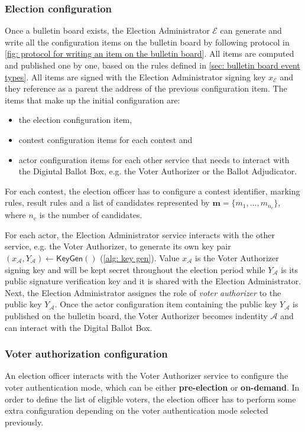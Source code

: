 \subsubsection{Election configuration} \label{sec: election configuration}
Once a bulletin board exists, the Election Administrator $\mathcal{E}$ can generate and write all the configuration items on the bulletin board by following protocol in \cref{fig: protocol for writing an item on the bulletin board}. All items are computed and published one by one, based on the rules defined in \cref{sec: bulletin board event types}. All items are signed with the Election Administrator signing key $x_\mathcal{E}$ and they reference as a parent the address of the previous configuration item. The items that make up the initial configuration are:
\begin{itemize}
    \item the election configuration item,
    \item contest configuration items for each contest and
    \item actor configuration items for each other service that needs to interact with the Digiutal Ballot Box, e.g. the Voter Authorizer or the Ballot Adjudicator.
\end{itemize}

For each contest, the election officer has to configure a contest identifier, marking rules, result rules and a list of candidates represented by $\boldsymbol{m} = \{ m_1, ..., m_{n_\mathrm{c}} \}$, where $n_\mathrm{c}$ is the number of candidates.

For each actor, the Election Administrator service interacts with the other service, e.g. the Voter Authorizer, to generate its own key pair $(x_\mathcal{A}, Y_\mathcal{A}) \gets \mathsf{KeyGen}()$ (\cref{alg: key gen}). Value $x_\mathcal{A}$ is the Voter Authorizer signing key and will be kept secret throughout the election period while $Y_\mathcal{A}$ is its public signature verification key and it is shared with the Election Administrator. Next, the Election Administrator assignes the role of \textit{voter authorizer} to the public key $Y_\mathcal{A}$. Once the actor configuration item containing the public key $Y_\mathcal{A}$ is published on the bulletin board, the Voter Authorizer becomes indentity $\mathcal{A}$ and can interact with the Digital Ballot Box.


\subsubsection{Voter authorization configuration} \label{sec: voter authorization configuration}
An election officer interacts with the Voter Authorizer service to configure the voter authentication mode, which can be either \textbf{pre-election} or \textbf{on-demand}. In order to define the list of eligible voters, the election officer has to perform some extra configuration depending on the voter authentication mode selected previously.

